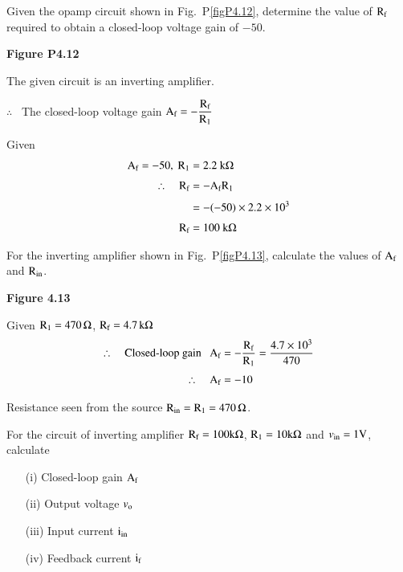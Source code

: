 \begin{problem}\label{prob5.12}
Given the opamp circuit shown in Fig.~P\eqref{figP4.12}, determine the value of $\textrm{R}_{\textrm{f}}$ required to obtain a closed-loop voltage gain of $-50$.
\begin{center}
{\bf Figure P4.12}
\end{center}
\end{problem}

\begin{solution}
The given circuit is an inverting amplifier.

$\therefore$~ The closed-loop voltage gain $\textrm{A}_{\textrm{f}}=-\dfrac{\textrm{R}_{\textrm{f}}}{\textrm{R}_{1}}$

Given
\begin{align*}
\textrm{A}_{\textrm{f}}=-50, ~ \textrm{R}_{1} &= 2.2~ \textrm{k}\Omega\\[3pt]
\therefore\quad \textrm{R}_{\textrm{f}} &= -\textrm{A}_{\textrm{f}}\textrm{R}_{1}\\[3pt]
&= -(-50)\times 2.2\times 10^{3}\\[3pt]
\textrm{R}_{\textrm{f}} &= 100~ \textrm{k} \Omega
\end{align*}
\end{solution}

\begin{problem}\label{prob4.13}
For the inverting amplifier shown in Fig.~P\ref{figP4.13}, calculate the values of $\textrm{A}_{\textrm{f}}$ and $\textrm{R}_{\text{in}}$.
\begin{center}
{\bf Figure 4.13}
\end{center}
\end{problem}

\begin{solution}
Given $\textrm{R}_{1}=470\,\Omega$, $\textrm{R}_{\textrm{f}}=4.7\,\textrm{k}\Omega$
\begin{align*}
\therefore\quad \text{Closed-loop gain~~ } \textrm{A}_{\text{f}} &= -\frac{\textrm{R}_{\textrm{f}}}{\textrm{R}_{1}}=\frac{4.7\times 10^{3}}{470}\\[3pt]
\therefore\quad \textrm{A}_{\textrm{f}} &= -10
\end{align*}

Resistance seen from the source $\textrm{R}_{\text{in}}=\textrm{R}_{1}=470\,\Omega$.
\end{solution}

\begin{problem}\label{prob4.14}
For the circuit of inverting amplifier $\textrm{R}_{\textrm{f}}=100 \textrm{k}\Omega$, $\textrm{R}_{1}=10 \textrm{k}\Omega$ and $v_{\text{in}}=1\textrm{V}$, calculate
\begin{itemize}
\item[(i)] Closed-loop gain $\textrm{A}_{\textrm{f}}$

\item[(ii)] Output voltage $v_{\textrm{o}}$

\item[(iii)] Input current $\textrm{i}_{\text{in}}$

\item[(iv)] Feedback current $\textrm{i}_{\textrm{f}}$
\end{itemize}
\end{problem}

